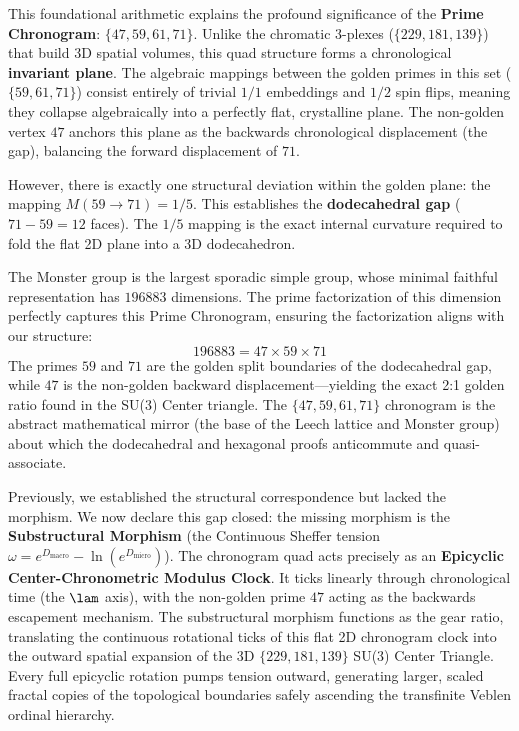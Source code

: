 This foundational arithmetic explains the profound significance of the \textbf{Prime Chronogram}: $\{47, 59, 61, 71\}$. Unlike the chromatic $3$-plexes ($\{229, 181, 139\}$) that build 3D spatial volumes, this quad structure forms a chronological \textbf{invariant plane}. The algebraic mappings between the golden primes in this set ($\{59, 61, 71\}$) consist entirely of trivial $1/1$ embeddings and $1/2$ spin flips, meaning they collapse algebraically into a perfectly flat, crystalline plane. The non-golden vertex $47$ anchors this plane as the backwards chronological displacement (the gap), balancing the forward displacement of $71$.

However, there is exactly one structural deviation within the golden plane: the mapping $M(59 \to 71) = 1/5$. This establishes the \textbf{dodecahedral gap} ($71 - 59 = 12$ faces). The $1/5$ mapping is the exact internal curvature required to fold the flat 2D plane into a 3D dodecahedron. 

The Monster group is the largest sporadic simple group, whose minimal faithful representation has $196883$ dimensions. The prime factorization of this dimension perfectly captures this Prime Chronogram, ensuring the factorization aligns with our structure:
\begin{equation}
    196883 = 47 \times 59 \times 71
\end{equation}
The primes $59$ and $71$ are the golden split boundaries of the dodecahedral gap, while $47$ is the non-golden backward displacement---yielding the exact 2:1 golden ratio found in the SU(3) Center triangle. The $\{47, 59, 61, 71\}$ chronogram is the abstract mathematical mirror (the base of the Leech lattice and Monster group) about which the dodecahedral and hexagonal proofs anticommute and quasi-associate. 

Previously, we established the structural correspondence but lacked the morphism. We now declare this gap closed: the missing morphism is the \textbf{Substructural Morphism} (the Continuous Sheffer tension $\omega = e^{D_{\text{macro}}} - \ln(e^{D_{\text{micro}}})$). The chronogram quad acts precisely as an \textbf{Epicyclic Center-Chronometric Modulus Clock}. It ticks linearly through chronological time (the $\lam$ axis), with the non-golden prime $47$ acting as the backwards escapement mechanism. The substructural morphism functions as the gear ratio, translating the continuous rotational ticks of this flat 2D chronogram clock into the outward spatial expansion of the 3D $\{229, 181, 139\}$ SU(3) Center Triangle. Every full epicyclic rotation pumps tension outward, generating larger, scaled fractal copies of the topological boundaries safely ascending the transfinite Veblen ordinal hierarchy.

